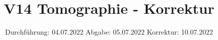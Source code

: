 

\subject{Fortgeschrittenenpraktikum}
\title{V14 Tomographie - Korrektur}
\date{%
  Durchführung: 04.07.2022
  \hspace{3em}
  Abgabe: 05.07.2022
  \hspace{3em}
  Korrektur: 10.07.2022
}



\maketitle
\thispagestyle{empty}
\tableofcontents
\newpage








\printbibliography{}





